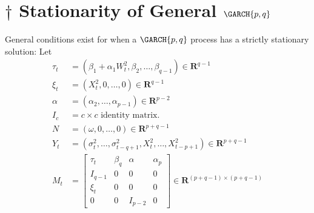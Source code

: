 \section{\texorpdfstring{$ \dagger $}{†} Stationarity of General \texorpdfstring{$ \GARCH{p,q} $}{GARCH(𝑝, 𝑞)}}
General conditions exist for when a $ \GARCH{p,q} $ process has a strictly stationary solution: Let
\begin{align*}
    \tau_{t} & =(\beta_{1}+\alpha_{1} W_{t}^{2}, \beta_{2}, \ldots, \beta_{q-1})\in \mathbf{R}^{q-1}                  \\
    \xi_{t}  & =(X_{t}^{2}, 0, \ldots, 0) \in \mathbf{R}^{q-1}                                                        \\
    \alpha   & =(\alpha_{2}, \ldots, \alpha_{p-1}) \in \mathbf{R}^{p-2}                                               \\
    I_{c}    & =c\times c \text{ identity matrix.}                                                                    \\
    N        & =(\omega, 0, \ldots, 0) \in \mathbf{R}^{p+q-1}                                                         \\
    Y_{t}    & =(\sigma_{t}^{2}, \ldots, \sigma_{t-q+1}^{2}, X_{t}^{2}, \ldots, X_{t-p+1}^{2}) \in \mathbf{R}^{p+q-1} \\
    M_{t}    & =\begin{bmatrix}
        \tau_{t} & \beta_{q} & \alpha  & \alpha_{p} \\
        I_{q-1}  & 0         & 0       & 0          \\
        \xi_{t}  & 0         & 0       & 0          \\
        0        & 0         & I_{p-2} & 0
    \end{bmatrix}\in \mathbf{R}^{(p+q-1) \times (p+q-1)}
\end{align*}

